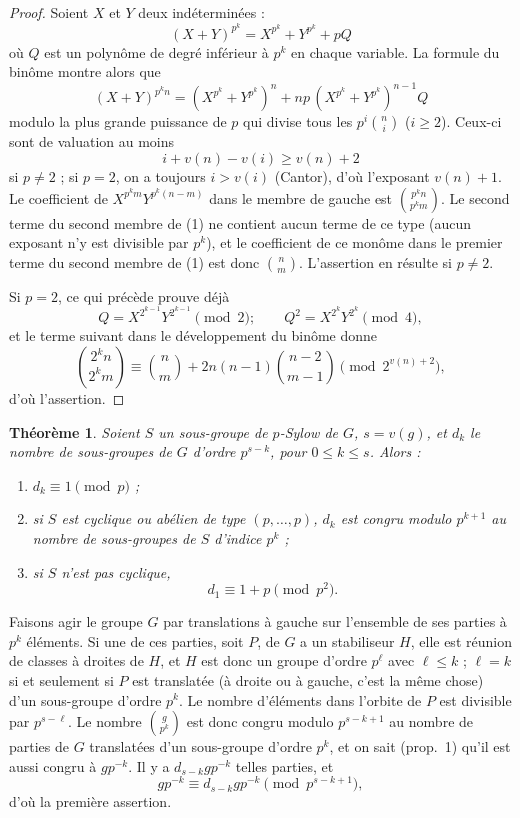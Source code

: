 \documentclass[11pt]{article}
\newtheorem*{theoreme}{Théorème}
\begin{document}
\begin{proof}
Soient \(X\) et \(Y\) deux indéterminées :
\[
        (X+Y)^{p^k}=X^{p^k}+Y^{p^k}+pQ
\]
où \(Q\) est un polynôme de degré inférieur à \(p^k\) en chaque variable. La
formule du binôme montre alors que
\begin{equation}
 (X+Y)^{p^k n}
 =(X^{p^k}+Y^{p^k})^n+
 np\,(X^{p^k}+Y^{p^k})^{n-1}Q
\tag{1}
\end{equation}
modulo la plus grande puissance de \(p\) qui divise tous les
\(p^i\binom{n}{i}\) (\(i\geq2\)). Ceux-ci sont de valuation au moins
\[
        i+v(n)-v(i)\geq v(n)+2
\]
si \(p\neq2\) ; si \(p=2\), on a toujours \(i>v(i)\) (Cantor), d'où
l'exposant \(v(n)+1\). Le coefficient de
\(X^{p^k m}Y^{p^k(n-m)}\) dans le membre de gauche est
\(\binom{p^k n}{p^k m}\). Le second terme du second membre de (1) ne contient
aucun terme de ce type (aucun exposant n'y est divisible par \(p^k\)), et le
coefficient de ce monôme dans le premier terme du second membre de (1) est donc
\(\binom{n}{m}\). L'assertion en résulte si \(p\neq2\).

Si \(p=2\), ce qui précède prouve déjà
\[
        Q=X^{2^{k-1}}Y^{2^{k-1}}\pmod 2;
        \qquad Q^2=X^{2^k}Y^{2^k}\pmod 4,
\]
et le terme suivant dans le développement du binôme donne
\[
        \binom{2^k n}{2^k m}
        \equiv \binom{n}{m}
        +2n(n-1)\binom{n-2}{m-1}
        \pmod {2^{v(n)+2}},
\]
d'où l'assertion.
\end{proof}

\begin{theoreme}
Soient \(S\) un sous-groupe de \(p\)-Sylow de \(G\), \(s=v(g)\), et \(d_k\) le
nombre de sous-groupes de \(G\) d'ordre \(p^{s-k}\), pour \(0\leq k\leq s\).
Alors :
\begin{enumerate}[label=(\roman*)]
\item \(d_k\equiv1\pmod p\) ;
\item si \(S\) est cyclique ou abélien de type \((p,\ldots,p)\), \(d_k\) est
congru modulo \(p^{k+1}\) au nombre de sous-groupes de \(S\) d'indice \(p^k\) ;
\item si \(S\) n'est pas cyclique,
\[
        d_1\equiv1+p\pmod {p^2}.
\]
\end{enumerate}
\end{theoreme}

Faisons agir le groupe \(G\) par translations à gauche sur l'ensemble de ses
parties à \(p^k\) éléments. Si une de ces parties, soit \(P\), de \(G\) a un
stabiliseur \(H\), elle est réunion de classes à droites de \(H\), et \(H\) est
donc un groupe d'ordre \(p^\ell\) avec \(\ell\leq k\) ; \(\ell=k\) si et
seulement si \(P\) est translatée (à droite ou à gauche, c'est la même chose)
d'un sous-groupe d'ordre \(p^k\). Le nombre d'éléments dans l'orbite de \(P\)
est divisible par \(p^{s-\ell}\). Le nombre \(\binom{g}{p^k}\) est donc congru
modulo \(p^{s-k+1}\) au nombre de parties de \(G\) translatées d'un sous-groupe
d'ordre \(p^k\), et on sait (prop.~1) qu'il est aussi congru à \(gp^{-k}\).
Il y a \(d_{s-k}gp^{-k}\) telles parties, et
\[
        gp^{-k}\equiv d_{s-k}gp^{-k}\pmod {p^{s-k+1}},
\]
d'où la première assertion.
\end{document}
